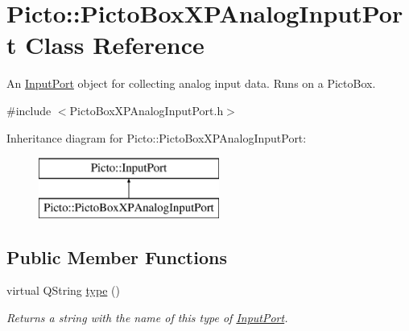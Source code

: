 \hypertarget{class_picto_1_1_picto_box_x_p_analog_input_port}{\section{Picto\-:\-:Picto\-Box\-X\-P\-Analog\-Input\-Port Class Reference}
\label{class_picto_1_1_picto_box_x_p_analog_input_port}
}


An \hyperlink{class_picto_1_1_input_port}{Input\-Port} object for collecting analog input data. Runs on a Picto\-Box.  




{\ttfamily \#include $<$Picto\-Box\-X\-P\-Analog\-Input\-Port.\-h$>$}

Inheritance diagram for Picto\-:\-:Picto\-Box\-X\-P\-Analog\-Input\-Port\-:\begin{figure}[H]
\begin{center}
\leavevmode
\includegraphics[height=2.000000cm]{class_picto_1_1_picto_box_x_p_analog_input_port}
\end{center}
\end{figure}
\subsection*{Public Member Functions}
\begin{DoxyCompactItemize}
\item 
\hypertarget{class_picto_1_1_picto_box_x_p_analog_input_port_a41f62489bf8bdfbd303ee5b699f01c04}{virtual Q\-String \hyperlink{class_picto_1_1_picto_box_x_p_analog_input_port_a41f62489bf8bdfbd303ee5b699f01c04}{type} ()}\label{class_picto_1_1_picto_box_x_p_analog_input_port_a41f62489bf8bdfbd303ee5b699f01c04}

\begin{DoxyCompactList}\small\item\em Returns a string with the name of this type of \hyperlink{class_picto_1_1_input_port}{Input\-Port}. \end{DoxyCompactList}\end{DoxyCompactItemize}
